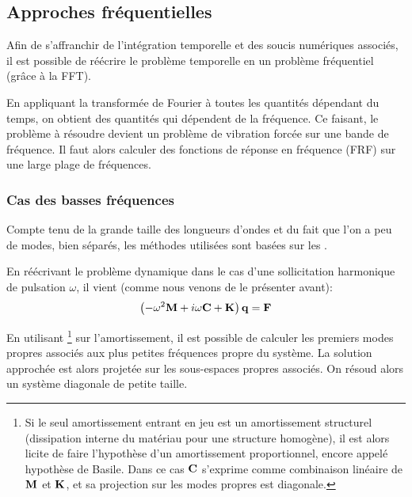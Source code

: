\medskip
\subsection{Approches fréquentielles}

Afin de s'affranchir de l'intégration temporelle et des soucis numériques associés, il est
possible de réécrire le problème temporelle en un problème fréquentiel (grâce à
la FFT).


\medskip
En appliquant la transformée de Fourier
à toutes les quantités dépendant du temps,
on obtient des quantités qui dépendent de la fréquence.
Ce faisant, le problème à résoudre devient un problème de vibration
forcée sur une bande de fréquence.
Il faut alors calculer des fonctions de réponse en fréquence (FRF) sur une large plage
de fréquences.

\medskip
\subsubsection{Cas des basses fréquences}

Compte tenu de la grande taille des longueurs d'ondes et du fait que l'on a peu de modes, bien séparés,
les méthodes utilisées sont basées sur les .

En réécrivant le problème dynamique dans le cas d'une sollicitation harmonique de pulsation
$\omega$, il vient (comme nous venons de le présenter avant):
\begin{equation}
\left(-\omega^2\MM{M}+i\omega \MM{C}+\MM{K}\right)\VV{q} = \VV{F}
\end{equation}

En utilisant \footnote{%
Si le seul amortissement entrant en jeu est un amortissement structurel (dissipation
interne du matériau pour une structure homogène), il est alors licite de faire
l'hypothèse d'un amortissement proportionnel, encore appelé hypothèse de
Basile. Dans ce cas $\MM{C}$ s'exprime comme combinaison linéaire de $\MM{M}$ et $\MM{K}$,
et sa projection sur les modes propres est diagonale.
} sur l'amortissement, il est possible de calculer les premiers modes propres
associés aux plus petites fréquences propre du système.
La solution approchée est alors projetée sur les sous-espaces propres associés.
On résoud alors un système diagonale de petite taille.


